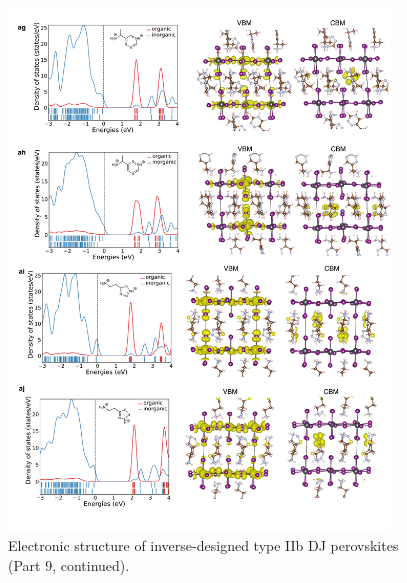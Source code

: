 \begin{figure}[htbp]
    \ContinuedFloat
    \centering
    \includegraphics[width=0.9\textwidth]{figures/synthesis-feasibility/figure5-25-9.png}
    \caption{Electronic structure of inverse-designed type IIb DJ perovskites (Part 9, continued).}
\end{figure}


